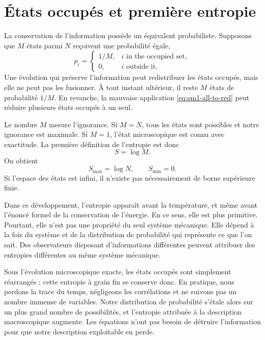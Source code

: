 \section{États occupés et première entropie}

La conservation de l’information possède un équivalent probabiliste. Supposons que \(M\) états parmi \(N\) reçoivent une probabilité égale,
\begin{equation}
 p_i=
 \begin{cases}
 1/M, & i\text{ in the occupied set},\\
 0, & i\text{ outside it}.
 \end{cases}
 \label{eq:sm1-uniform-occupied}
\end{equation}
Une évolution qui préserve l’information peut redistribuer les états occupés, mais elle ne peut pas les fusionner. À tout instant ultérieur, il reste \(M\) états de probabilité \(1/M\). En revanche, la mauvaise application \eqref{eq:sm1-all-to-red} peut réduire plusieurs états occupés à un seul.

Le nombre \(M\) mesure l’ignorance. Si \(M=N\), tous les états sont possibles et notre ignorance est maximale. Si \(M=1\), l’état microscopique est connu avec exactitude. La première définition de l’entropie est donc
\begin{equation}
 S=\log M.
 \label{eq:sm1-entropy-logm}
\end{equation}
On obtient
\begin{equation}
 S_{\max}=\log N,
 \qquad
 S_{\min}=0.
\end{equation}
Si l’espace des états est infini, il n’existe pas nécessairement de borne supérieure finie.

Dans ce développement, l’entropie apparaît avant la température, et même avant l’énoncé formel de la conservation de l’énergie. En ce sens, elle est plus primitive. Pourtant, elle n’est pas une propriété du seul système mécanique. Elle dépend à la fois du système et de la distribution de probabilité qui représente ce que l’on sait. Des observateurs disposant d’informations différentes peuvent attribuer des entropies différentes au même système mécanique.

Sous l’évolution microscopique exacte, les états occupés sont simplement réarrangés ; cette entropie à grain fin se conserve donc. En pratique, nous perdons la trace du temps, négligeons les corrélations et ne suivons pas un nombre immense de variables. Notre distribution de probabilité s’étale alors sur un plus grand nombre de possibilités, et l’entropie attribuée à la description macroscopique augmente. Les équations n’ont pas besoin de détruire l’information pour que notre description exploitable en perde.


